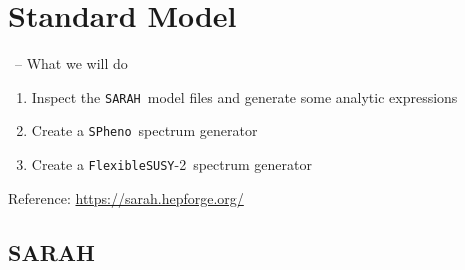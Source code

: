 \documentclass[11pt]{beamer}
\newcommand{\FlexibleSUSY}{\texttt{FlexibleSUSY}}
\newcommand{\hc}{\text{h.c.}}
\newcommand{\Lagrin}{\mathcal{L}_{\text{int}}}
\newcommand{\SARAH}{\texttt{SARAH}}
\newcommand{\SPheno}{\texttt{SPheno}}
\begin{document}




\section{Standard Model}



\begin{frame}[fragile]{\insertsection\ -- What we will do}
  \begin{enumerate}
  \item Inspect the \SARAH\ model files and generate some analytic
    expressions
  \item Create a \SPheno\ spectrum generator 
  \item Create a \FlexibleSUSY-2\ spectrum generator 
  \end{enumerate}
  Reference: \url{https://sarah.hepforge.org/}
\end{frame}


\subsection{SARAH}
\end{document}

